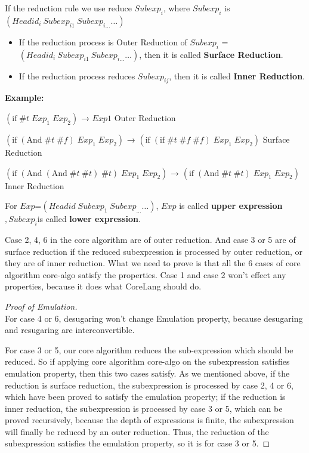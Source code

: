 If the reduction rule we use reduce $Subexp_{i}$, where $Subexp_{i}$ is $(Headid_{i}~Subexp_{i1}~Subexp_{i\ldots} \ldots)$
\begin{itemize}
	\item If the reduction process is Outer Reduction of $Subexp_{i}$ = $(Headid_{i}~Subexp_{i1}~Subexp_{i\ldots} \ldots)$, then it is called {\bfseries Surface Reduction}.
	\item If the reduction process reduces $Subexp_{ij}$, then it is called {\bfseries Inner Reduction}.
\end{itemize}

{\bfseries Example:}

$(\mbox{if}\; \#t\; Exp_{1}\; Exp_{2})$ → $Exp1$ \hfill Outer Reduction

$(\mbox{if}\; (\mbox{And}\; \#t\; \#f)\; Exp_{1}\; Exp_{2})$ → $(\mbox{if}\; (\mbox{if}\; \#t\; \#f\; \#f)\; Exp_{1}\; Exp_{2})$ \hfill Surface Reduction

$(\mbox{if}\; (\mbox{And}\; (\mbox{And}\; \#t\; \#t)\; \#t) \; Exp_{1}\; Exp_{2})$ → $(\mbox{if}\; (\mbox{And}\; \#t\; \#t)\; Exp_{1}\; Exp_{2})$ \hfill Inner Reduction

\begin{Def}
For $Exp$=$(Headid\;Subexp_{1}\;Subexp_{\ldots} \ldots)$, $Exp$ is called {\bfseries upper expression}$,Subexp_{i}$is called {\bfseries lower expression}.
\end{Def}

Case 2, 4, 6 in the core algorithm are of outer reduction. And case 3 or 5 are of surface reduction if the reduced subexpression is processed by outer reduction, or they are of inner reduction.
What we need to prove is that all the 6 cases of core algorithm core-algo satisfy the properties. Case 1 and case 2 won't effect any properties, because it does what CoreLang should do.

\begin{proof}[Proof of Emulation]
\hfill\\
For case 4 or 6, desugaring won't change Emulation property, because desugaring and resugaring are interconvertible.

For case 3 or 5, our core algorithm reduces the sub-expression which should be reduced. So if applying core algorithm core-algo on the subexpression satisfies emulation property, then this two cases satisfy. As we mentioned above, if the reduction is surface reduction, the subexpression is processed by case 2, 4 or 6, which have been proved to satisfy the emulation property; if the reduction is inner reduction, the subexpression is processed by case 3 or 5, which can be proved recursively, because the depth of expressions is finite, the subexpression will finally be reduced by an outer reduction. Thus, the reduction of the subexpression satisfies the emulation property, so it is for case 3 or 5.

\end{proof}


